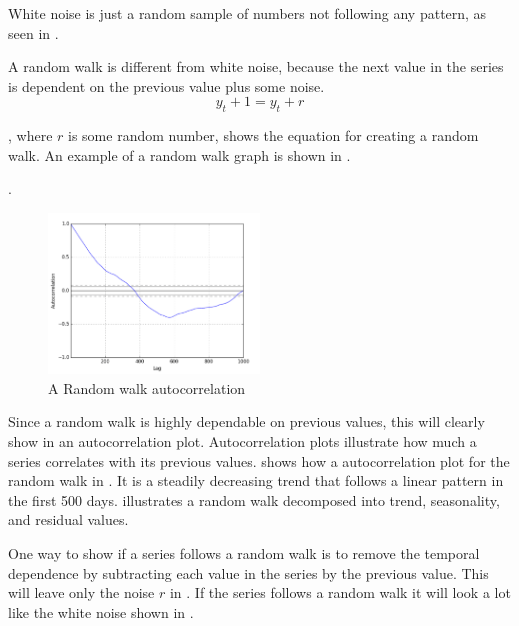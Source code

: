 White noise is just a random sample of numbers not following any pattern, as seen in
.

A random walk is different from white noise, because the next value in the series is dependent on the previous value plus some noise.
\begin{equation}
  y_t+1 = y_t + r
  \label{eq:random_walk}
\end{equation}

, where $r$ is some random number, shows the equation for creating a random walk.
An example of a random walk graph is shown in .

.
\begin{figure}[H]
  \centering
  \includegraphics[width=0.5\textwidth]{./figs/illustrations/random_walk_autocorrelation.png}
  \hfill
  \caption{A Random walk autocorrelation}
  \label{fig:dataset:random_walk_autocorrelation}
\end{figure}

Since a random walk is highly dependable on previous values, this will clearly show in an autocorrelation plot.
Autocorrelation plots illustrate how much a series correlates with its previous values.
 shows how a autocorrelation plot for the random walk in .
It is a steadily decreasing trend that follows a linear pattern in the first 500 days.
 illustrates a random walk decomposed into trend, seasonality, and residual values.

One way to show if a series follows a random walk is to remove the temporal dependence by subtracting each value in the series by the previous value.
This will leave only the noise $r$ in .
If the series follows a random walk it will look a lot like the white noise shown in .

